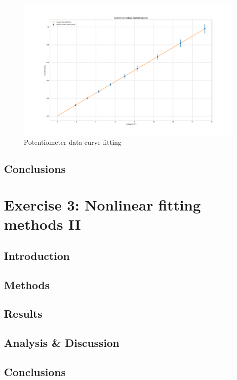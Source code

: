 \documentclass[letterpaper,12pt]{article}
\begin{document}
\begin{figure}[H]
  \centering
  \includegraphics[width=0.95\linewidth]{../lab_1_ex_1_plot_potentiometer.png}    
  \caption{Potentiometer data curve fitting}
  \label{potentiometer-curve-fit}
\end{figure}

\subsection{Conclusions}

\pagebreak

\section{Exercise 3:  Nonlinear fitting methods II}

\subsection{Introduction}
\subsection{Methods}
\subsection{Results}
\subsection{Analysis \& Discussion }
\subsection{Conclusions}

\pagebreak
\end{document}
